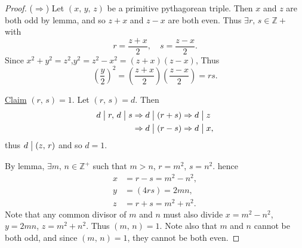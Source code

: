 \begin{proof}
    ($\Rightarrow$) Let $\left(x,\,y,\,z\right)$ be a primitive pythagorean triple.
    Then $x$ and $z$ are both odd by lemma, and so $z+x$ and $z-x$ are both even.
    Thus $\exists r,\,s \in \mathbb{Z}+$ with
    \[r=\frac{z+x}{2},\quad s=\frac{z-x}{2}.\]
    Since $x^2+y^2=z^2$,$y^2=z^2-x^2=\left(z+x\right)\left(z-x\right)$,
    Thus
    \[\left( \frac{y}{2} \right)^2=\left( \frac{z+x}{2} \right)\left( \frac{z-x}{2} \right)=rs.\]

    \underline{Claim} $\left(r,\,s\right)=1$. Let $\left(r,\,s\right)=d$. Then
    \begin{align*}
        d \bigm| r,\, d\bigm| s &\Rightarrow d \bigm| \left(r+s\right) \Rightarrow d \bigm| z \\
        &\Rightarrow d \bigm| \left(r-s\right) \Rightarrow d \bigm| x,
    \end{align*}
    thus $d \bigm| \left(z,\,r\right)$ and so $d=1$.

    By lemma, $\exists m,\,n\in\mathbb{Z}^+$ such that $m>n$, $r=m^2$, $s=n^2$.
    hence
    \begin{align*}
        x&=r-s=m^2-n^2, \\
        y&=\left(4rs\right)=2mn, \\
        z&=r+s=m^2+n^2.
    \end{align*}
    Note that any common divisor of $m$ and $n$ must also divide $x=m^2-n^2$,
    $y=2mn$, $z=m^2+n^2$. Thus $\left(m,\,n\right)=1$.
    Note also that $m$ and $n$ cannot be both odd, and since $\left(m,\,n\right)=1$,
    they cannot be both even.
\end{proof}